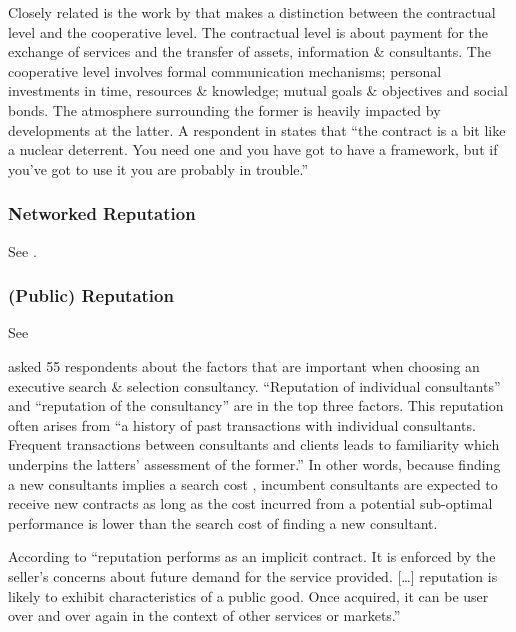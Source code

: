 \documentclass[12pt]{article}
\begin{document}
Closely related is the work by \citet[9-13]{willcockskern} that makes a
distinction between the contractual level and the cooperative level. The
contractual level is about payment for the exchange of services and the
transfer of assets, information \& consultants. The cooperative level
involves formal communication mechanisms; personal investments in time,
resources \& knowledge; mutual goals \& objectives and social bonds. The
atmosphere surrounding the former is heavily impacted by developments at
the latter. A respondent in \citet[9]{willcockskern} states that ``the
contract is a bit like a nuclear deterrent. You need one and you have
got to have a framework, but if you've got to use it you are probably in
trouble.''

\hypertarget{networked-reputation}{%
\subsubsection{Networked Reputation}\label{networked-reputation}}

See \citep[ 75]{armbruster2006}.

\hypertarget{public-reputation}{%
\subsubsection{(Public) Reputation}\label{public-reputation}}

See \citep[ 76]{armbruster2006}

\citet[243-244]{clark1993} asked 55 respondents about the factors that
are important when choosing an executive search \& selection
consultancy. ``Reputation of individual consultants'' and ``reputation
of the consultancy'' are in the top three factors. This reputation often
arises from ``a history of past transactions with individual
consultants. Frequent transactions between consultants and clients leads
to familiarity which underpins the latters' assessment of the former.''
In other words, because finding a new consultants implies a search cost
\citep[ 1072]{wilson2012}, incumbent consultants are expected to receive
new contracts as long as the cost incurred from a potential sub-optimal
performance is lower than the search cost of finding a new consultant.

According to \citet[516]{nayyar1990} ``reputation performs as an
implicit contract. It is enforced by the seller's concerns about future
demand for the service provided. {[}\ldots{]} reputation is likely to
exhibit characteristics of a public good. Once acquired, it can be user
over and over again in the context of other services or markets.''
\end{document}
